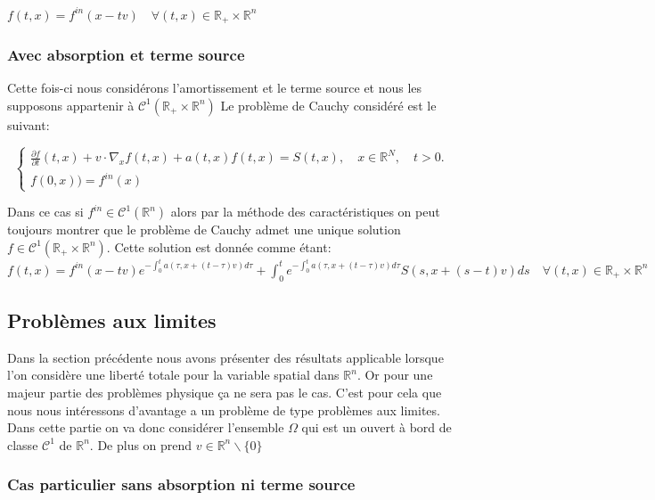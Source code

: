 \documentclass[onecolumn, 12pt, a4paper]{article}
\begin{document}
$\boxed{f(t,x)=f^{in}(x-tv) \quad \forall (t,x) \in \mathbb{R}_+ \times \mathbb{R}^n }$




\subsubsection{Avec absorption et terme source}

Cette fois-ci nous considérons l'amortissement et le terme source et nous les supposons appartenir à $\mathcal{C}^1(\mathbb{R}_+ \times \mathbb{R}^n)$ Le problème de Cauchy considéré est le suivant:

	
\[
\begin{cases}
\frac{\partial f}{\partial t}(t,x)+v \cdot \nabla_x f(t,x) + a(t,x)f(t,x) = S(t,x), \quad x \in \mathbb{R}^N, \quad t>0.\\
f(0,x)) = f^{in}(x)
\end{cases}
\]

Dans ce cas si $f^{in} \in \mathcal{C}^1(\mathbb{R}^n)$ alors par la méthode des caractéristiques on peut toujours montrer que le problème de Cauchy admet une unique solution $f \in \mathcal{C}^1(\mathbb{R}_+ \times \mathbb{R}^n)$. Cette solution est donnée comme étant:\\
$\boxed{f(t,x)=f^{in}(x-tv) e^{-\int_0 ^t a(\tau,x+(t-\tau)v)d\tau} + \int_0 ^t  e^{-\int_0 ^t a(\tau,x+(t-\tau)v)d\tau} S(s,x+(s-t)v)ds \quad \forall (t,x) \in \mathbb{R}_+ \times \mathbb{R}^n }$

\subsection{Problèmes aux limites}



Dans la section précédente nous avons présenter des résultats applicable lorsque l'on considère une liberté totale pour la variable spatial dans $\mathbb{R}^n$. Or pour une majeur partie des problèmes physique ça ne sera pas le cas. C'est pour cela que nous nous intéressons d'avantage a un problème de type problèmes aux limites. Dans cette partie on va donc considérer l'ensemble $\Omega$ qui est un ouvert à bord de classe $\mathcal{C}^1$ de $\mathbb{R}^n$. De plus on prend $v \in \mathbb{R}^n\backslash \{0\}$

\subsubsection{Cas particulier sans absorption ni terme source}
\end{document}
